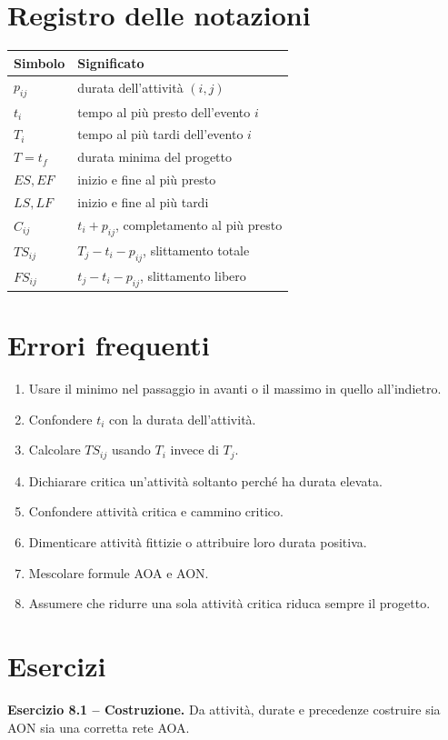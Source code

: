 \documentclass[11pt,a4paper]{article}
\begin{document}
\section{Registro delle notazioni}
\begin{notationbox}\begin{center}\begin{tabular}{ll}\toprule
Simbolo&Significato\\\midrule
$p_{ij}$&durata dell'attività $(i,j)$\\
$t_i$&tempo al più presto dell'evento $i$\\
$T_i$&tempo al più tardi dell'evento $i$\\
$T=t_f$&durata minima del progetto\\
$ES,EF$&inizio e fine al più presto\\
$LS,LF$&inizio e fine al più tardi\\
$C_{ij}$&$t_i+p_{ij}$, completamento al più presto\\
$TS_{ij}$&$T_j-t_i-p_{ij}$, slittamento totale\\
$FS_{ij}$&$t_j-t_i-p_{ij}$, slittamento libero\\\bottomrule
\end{tabular}\end{center}\end{notationbox}

\section{Errori frequenti}
\begin{enumerate}
\item Usare il minimo nel passaggio in avanti o il massimo in quello all'indietro.
\item Confondere $t_i$ con la durata dell'attività.
\item Calcolare $TS_{ij}$ usando $T_i$ invece di $T_j$.
\item Dichiarare critica un'attività soltanto perché ha durata elevata.
\item Confondere attività critica e cammino critico.
\item Dimenticare attività fittizie o attribuire loro durata positiva.
\item Mescolare formule AOA e AON.
\item Assumere che ridurre una sola attività critica riduca sempre il progetto.
\end{enumerate}

\section{Esercizi}
\textbf{Esercizio 8.1 -- Costruzione.} Da attività, durate e precedenze costruire sia AON sia una corretta rete AOA.
\end{document}
